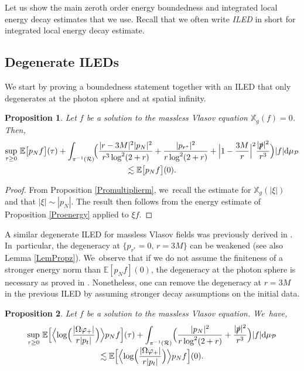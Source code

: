 \documentclass[JEP,XML,SOM,Unicode,published]{cedram}
\theoremstyle{plain}
\newtheorem{proposition}{Proposition}[section]
\theoremstyle{definition}
\newcommand\T{{\mathbb{X}}}
\newcommand\dr{{\mathrm{d}}}
\begin{document}
Let us show the main zeroth order energy boundedness and integrated local energy decay estimates that we use. Recall that we often write \emph{ILED} in short for integrated local energy decay estimate.

\subsection{Degenerate ILEDs}

We start by proving a boundedness statement together with an ILED that only degenerates at the photon sphere and at spatial infinity.

\begin{proposition}\label{ProremainderILED}
Let $f$ be a solution to the massless Vlasov equation $\T_g(f)=0$. Then,\vspace*{-5pt}
\begin{multline*}
\sup_{\tau \geq 0} \,\mathbb{E} \bigl[ p_N f \bigr](\tau)+\int_{\pi^{-1}(\mathcal{R})} \! \Bigl(\frac{|r-3M|^2|p_N|^2}{r^3 \log^2(2+r)}+ \frac{|p_{r^*}|^2 }{r \log^2(2+r)} + \Bigl |1-\frac{3M}{r} \Bigr|^2 \frac{|\slashed{p}|^2}{r^3} \Bigr) |f| \dr \mu_{\mathcal{P}} \\
\lesssim \mathbb{E} \bigl[ p_Nf \bigr](0).
\end{multline*}
\end{proposition}

\begin{proof}
From Proposition \ref{Promultiplierm}, we~recall the estimate for $\T_g(|\xi|)$ and that $|\xi|\sim |p_N|$. The result then follows from the energy estimate of Proposition \ref{Proenergy} applied to $\xi f$.
\end{proof}

A similar degenerate ILED for massless Vlasov fields was previously derived in \cite[Prop.\,3.4]{L23}. In~particular, the degeneracy at $\{p_{r^*}=0, \, r=3M \}$ can be weakened (see also Lemma \ref{LemPropz}). We~observe that if we do not assume the finiteness of a stronger energy norm than $\mathbb{E}[p_N f](0)$, the degeneracy at the photon sphere is necessary as proved in \cite[Prop.\,3.12]{L23}. Nonetheless, one can remove the degeneracy at $r=3M$ in the previous ILED by assuming stronger decay assumptions on the initial data.

\begin{proposition}\label{ProILED}
Let $f$ be a solution to the massless Vlasov equation. We~have,\vspace*{-5pt}
\begin{multline*}
\sup_{\tau \geq 0} \, \mathbb{E} \Bigl[ \Bigl\langle \log \Bigl(\frac{|\Omega \varphi_+ |}{r|p_t|} \Bigr) \Bigr\rangle p_N f \Bigr](\tau)+ \int_{\pi^{-1}(\mathcal{R})} \Bigl(\frac{|p_N|^2}{r \log^2(2+r)}+ \frac{|\slashed{p}|^2}{r^3} \Bigr) |f| \dr \mu_{\mathcal{P}} \\[-3pt]
\lesssim \mathbb{E} \Bigl[ \Bigl\langle \log \Bigl(\frac{|\Omega \varphi_+ |}{r|p_t|} \Bigr) \Bigr\rangle p_N f \Bigr](0).
\end{multline*}
\end{proposition}
\end{document}
